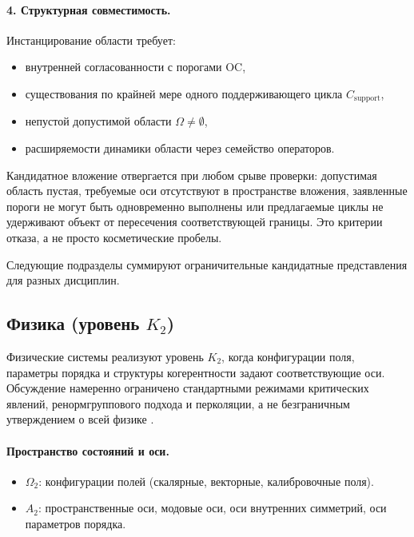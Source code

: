 \paragraph{4. Структурная совместимость.}
Инстанцирование области требует:
\begin{itemize}
  \item внутренней согласованности с порогами OC,
  \item существования по крайней мере одного поддерживающего цикла
        \(C_{\mathrm{support}}\),
  \item непустой допустимой области \(\Omega\neq\emptyset\),
  \item расширяемости динамики области через семейство операторов.
\end{itemize}

Кандидатное вложение отвергается при любом срыве проверки: допустимая
область пустая, требуемые оси отсутствуют в пространстве вложения, заявленные
пороги не могут быть одновременно выполнены или предлагаемые циклы не удерживают
объект от пересечения соответствующей границы. Это критерии отказа, а не
просто косметические пробелы.

Следующие подразделы суммируют ограничительные кандидатные представления
для разных дисциплин.

\subsection{Физика (уровень \texorpdfstring{$K_2$}{K2})}

Физические системы реализуют уровень \(K_2\), когда конфигурации
поля, параметры порядка и структуры когерентности задают соответствующие оси.
Обсуждение намеренно ограничено стандартными режимами критических
явлений, ренормгруппового подхода и перколяции, а не безграничным
утверждением о всей физике \parencite{goldenfeld_lectures,wilson_renormalization,stauffer_percolation}.

\paragraph{Пространство состояний и оси.}
\begin{itemize}
  \item \(\Omega_{2}\): конфигурации полей (скалярные, векторные,
        калибровочные поля).
  \item \(A_{2}\): пространственные оси, модовые оси, оси внутренних симметрий,
        оси параметров порядка.
\end{itemize}

